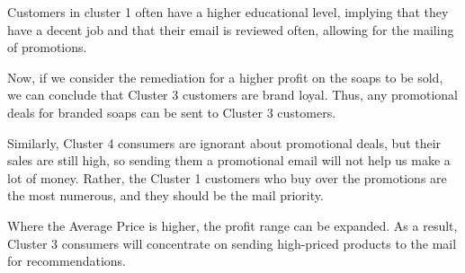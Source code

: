 \documentclass[
]{article}
\begin{document}
Customers in cluster 1 often have a higher educational level, implying
that they have a decent job and that their email is reviewed often,
allowing for the mailing of promotions.

Now, if we consider the remediation for a higher profit on the soaps to
be sold, we can conclude that Cluster 3 customers are brand loyal. Thus,
any promotional deals for branded soaps can be sent to Cluster 3
customers.

Similarly, Cluster 4 consumers are ignorant about promotional deals, but
their sales are still high, so sending them a promotional email will not
help us make a lot of money. Rather, the Cluster 1 customers who buy
over the promotions are the most numerous, and they should be the mail
priority.

Where the Average Price is higher, the profit range can be expanded. As
a result, Cluster 3 consumers will concentrate on sending high-priced
products to the mail for recommendations.
\end{document}
